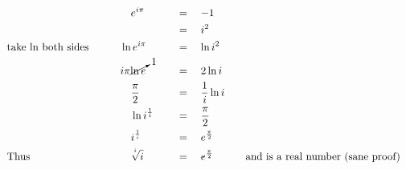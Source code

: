 \begin{alignat*}{5}
&\,&&\quad e^{i\pi}\quad&&\,=\quad-1\\
&\,&&\,&&\,=\quad i^2\\
&\mathrm{take~ln~both~sides}\qquad&&\ln{e^{i\pi}}\quad&&\,=\quad\ln{i^2}\\
&\,&&i\pi\cancelto{1}{\ln{e}}\quad&&\,=\quad2\ln{i}\\
&\,&&\quad\frac{\pi}{2}\quad&&\,=\quad\frac{{1}}{i}\ln{i}\\
&\,&&\quad\ln{i^\frac{1}{i}}\quad&&\,=\quad\frac{\pi}{2}\\
&\,&&\quad i^\frac{1}{i}\quad&&\,=\quad e^\frac{\pi}{2}\\
&\mathrm{Thus}&&\quad\sqrt[^i]{i}&&\,=\quad e^\frac{\pi}{2}&&\quad\mathrm{and~is~a~real~number~(sane~proof)}
\end{alignat*}
